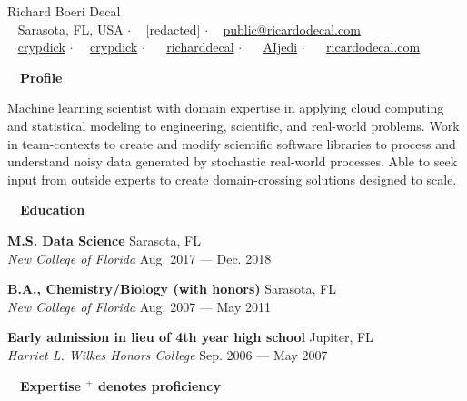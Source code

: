 \documentclass[a4paper,12pt]{article}
\newcommand{\resheading}[1]{{\hspace{-9pt} \colorbox{mygrey}{\begin{minipage}{\textwidth}{\textmd{~~\large \textbf{#1} \vphantom{p\^{E}}}}\end{minipage}}\vspace{6pt}} }
\newcommand{\ressubheading}[4]{{\begin{minipage}{\textwidth}
                                    \textbf{#1} \hfill #2 \\
                                    \textit{#3} \hfill #4 \\
\end{minipage}}}
\begin{document}
    \begin{center}
    {\Huge Richard Boeri Decal}
        \\
        {\small \faMapMarker~ Sarasota, FL, USA $\cdot$ \faPhone~ [redacted] $\cdot$ \faEnvelope~ \href{mailto:public@ricardodecal.com}{public@ricardodecal.com}  \\ \faGithubAlt~ \href{https://github.com/crypdick}{crypdick} $\cdot$~\faStackOverflow~  \href{https://stackoverflow.com/users/4212158/crypdick}{crypdick} $\cdot$ ~\faLinkedin~ \href{https://www.linkedin.com/in/richarddecal/}{richarddecal}  $\cdot$ ~\faTwitter~ \href{https://twitter.com/AIjedi}{AIjedi}  $\cdot$ ~\faHome~  \href{http://www.ricardodecal.com}{ricardodecal.com}}
    \end{center}

    \resheading{Profile}

    Machine learning scientist with domain expertise in applying cloud computing and statistical modeling to engineering, scientific, and real-world problems.
    Work in team-contexts to create and modify scientific software libraries to process and understand noisy data generated by stochastic real-world processes.
    Able to seek input from outside experts to create domain-crossing solutions designed to scale. \\

    \resheading{Education}

    \ressubheading{M.S. Data Science}{Sarasota, FL}{New College of Florida}{Aug. 2017 --- Dec. 2018}



    \ressubheading{B.A., Chemistry/Biology (with honors)}{Sarasota, FL}{New College of Florida}{Aug. 2007 --- May 2011}

    \ressubheading{Early admission in lieu of 4th year high school}{Jupiter, FL}{Harriet L. Wilkes Honors College}{Sep. 2006 --- May 2007}


    \resheading{Expertise \hfill {\small$^+$ denotes proficiency}}
\end{document}
